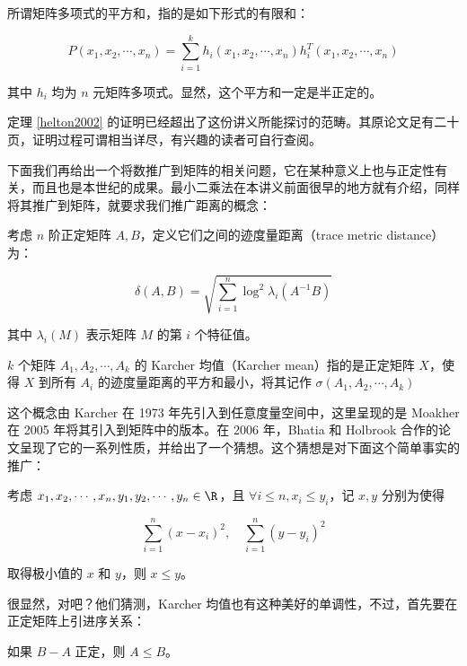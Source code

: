 \begin{definition}
    所谓矩阵多项式的平方和，指的是如下形式的有限和：

    \[
    P(x_1, x_2, \cdots, x_n) = \sum_{i = 1}^k h_i(x_1, x_2, \cdots, x_n)h_i^T(x_1, x_2, \cdots, x_n)
    \]

    其中 $h_i$ 均为 $n$ 元矩阵多项式。显然，这个平方和一定是半正定的。
\end{definition}

定理 \ref{helton2002} 的证明已经超出了这份讲义所能探讨的范畴。其原论文足有二十页，证明过程可谓相当详尽，有兴趣的读者可自行查阅。

下面我们再给出一个将数推广到矩阵的相关问题，它在某种意义上也与正定性有关，而且也是本世纪的成果。最小二乘法在本讲义前面很早的地方就有介绍，同样将其推广到矩阵，就要求我们推广距离的概念：

\begin{definition}
    考虑 $n$ 阶正定矩阵 $A, B$，定义它们之间的迹度量距离（trace metric distance）为：

    \[
    \delta(A, B) = \sqrt{\sum_{i = 1}^n \log^2\lambda_i(A^{-1}B)}
    \]

    其中 $\lambda_i(M)$ 表示矩阵 $M$ 的第 $i$ 个特征值。
\end{definition}

\begin{definition}
    $k$ 个矩阵 $A_1, A_2, \cdots, A_k$ 的 Karcher 均值（Karcher mean）指的是正定矩阵 $X$，使得 $X$ 到所有 $A_i$ 的迹度量距离的平方和最小，将其记作 $\sigma(A_1, A_2, \cdots, A_k)$
\end{definition}

这个概念由 Karcher 在 1973 年先引入到任意度量空间中，这里呈现的是 Moakher 在 2005 年将其引入到矩阵中的版本。在 2006 年，Bhatia 和 Holbrook 合作的论文呈现了它的一系列性质，并给出了一个猜想。这个猜想是对下面这个简单事实的推广：

\begin{lemma}
考虑 $x_1, x_2, \cdots, x_n, y_1, y_2, \cdots, y_n \in \R$，且 $\forall i \leqslant n, x_i \leqslant y_i$，记 $x, y$ 分别为使得

\[
\sum_{i = 1}^n (x - x_i)^2, \quad \sum_{i = 1}^n (y - y_i)^2
\]

取得极小值的 $x$ 和 $y$，则 $x \leqslant y$。
\end{lemma}

很显然，对吧？他们猜测，Karcher 均值也有这种美好的单调性，不过，首先要在正定矩阵上引进序关系：

\begin{definition}
    如果 $B - A$ 正定，则 $A \leqslant B$。
\end{definition}

